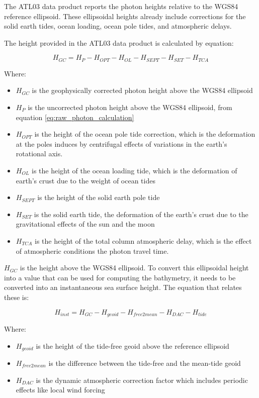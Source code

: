 The ATL03 data product reports the photon heights relative to the WGS84 reference ellipsoid. These ellipsoidal heights already include corrections for the solid earth tides, ocean loading, ocean pole tides, and atmospheric delays.

The height provided in the ATL03 data product is calculated by equation:

\[H_{GC} =  H_{P} - H_{OPT} - H_{OL} - H_{SEPT} - H_{SET} - H_{TCA}\]

Where:

\begin{itemize}
      \item \(H_{GC}\) is the geophysically corrected photon height above the WGS84 ellipsoid
      \item \(H_{P}\) is the uncorrected photon height above the WGS84 ellipsoid, from equation \ref{eq:raw_photon_calculation}
      \item \(H_{OPT}\) is the height of the ocean pole tide correction, which is the deformation at the poles induces by centrifugal effects of variations in the earth's rotational axis.
      \item \(H_{OL}\) is the height of the ocean loading tide, which is the deformation of earth's crust due to the weight of ocean tides
      \item \(H_{SEPT}\) is the height of the solid earth pole tide
      \item \(H_{SET}\) is the solid earth tide, the deformation of the earth's crust due to the gravitational effects of the sun and the moon
      \item \(H_{TCA}\) is the height of the total column atmospheric delay, which is the effect of atmospheric conditions the photon travel time.
\end{itemize}

$H_{GC}$ is the height above the WGS84 ellipsoid. To convert this ellipsoidal height into a value that can be used for computing the bathymetry, it needs to be converted into an instantaneous sea surface height. The equation that relates these is:

\begin{equation}
      H_{inst} = H_{GC} - H_{geoid} - H_{free2mean} - H_{DAC} - H_{tide} 
\end{equation}

Where:
\begin{itemize}
      \item $H_{geoid}$ is the height of the tide-free geoid above the reference ellipsoid
      \item $H_{free2mean}$ is the difference between the tide-free and the mean-tide geoid
      \item $H_{DAC}$ is the dynamic atmospheric correction factor which includes periodic effects like local wind forcing
\end{itemize}

